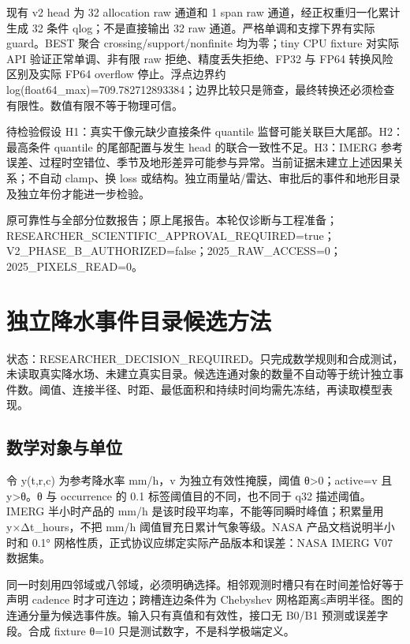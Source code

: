 \documentclass[UTF8,a4paper,10pt,fontset=fandol]{ctexart}
\begin{document}
现有 v2 head 为 32 allocation raw 通道和 1 span raw 通道，经正权重归一化累计生成 32 条件 qlog；不是直接输出 32 raw 通道。严格单调和支撑下界有实际 guard。BEST 聚合 crossing/support/nonfinite 均为零；tiny CPU fixture 对实际 API 验证正常单调、非有限 raw 拒绝、精度丢失拒绝、FP32 与 FP64 转换风险区别及实际 FP64 overflow 停止。浮点边界约 log(float64\_max)=709.782712893384；边界比较只是筛查，最终转换还必须检查有限性。数值有限不等于物理可信。\par

待检验假设 H1：真实干像元缺少直接条件 quantile 监督可能关联巨大尾部。H2：最高条件 quantile 的尾部配置与发生 head 的联合一致性不足。H3：IMERG 参考误差、过程时空错位、季节及地形差异可能参与异常。当前证据未建立上述因果关系；不自动 clamp、换 loss 或结构。独立雨量站/雷达、审批后的事件和地形目录及独立年份才能进一步检验。\par

原可靠性与全部分位数报告；原上尾报告。本轮仅诊断与工程准备；RESEARCHER\_SCIENTIFIC\_APPROVAL\_REQUIRED=true；V2\_PHASE\_B\_AUTHORIZED=false；2025\_RAW\_ACCESS=0；2025\_PIXELS\_READ=0。\par

\clearpage
\section*{独立降水事件目录候选方法}

状态：RESEARCHER\_DECISION\_REQUIRED。只完成数学规则和合成测试，未读取真实降水场、未建立真实目录。候选连通对象的数量不自动等于统计独立事件数。阈值、连接半径、时距、最低面积和持续时间均需先冻结，再读取模型表现。\par

\subsection*{数学对象与单位}

令 y(t,r,c) 为参考降水率 mm/h，v 为独立有效性掩膜，阈值 θ>0；active=v 且 y>θ。θ 与 occurrence 的 0.1 标签阈值目的不同，也不同于 q32 描述阈值。IMERG 半小时产品的 mm/h 是该时段平均率，不能等同瞬时峰值；积累量用 y×Δt\_hours，不把 mm/h 阈值冒充日累计气象等级。NASA 产品文档说明半小时和 0.1° 网格性质，正式协议应绑定实际产品版本和误差：NASA IMERG V07 数据集。\par

同一时刻用四邻域或八邻域，必须明确选择。相邻观测时槽只有在时间差恰好等于声明 cadence 时才可连边；跨槽连边条件为 Chebyshev 网格距离≤声明半径。图的连通分量为候选事件族。输入只有真值和有效性，接口无 B0/B1 预测或误差字段。合成 fixture θ=10 只是测试数字，不是科学极端定义。\par
\end{document}
